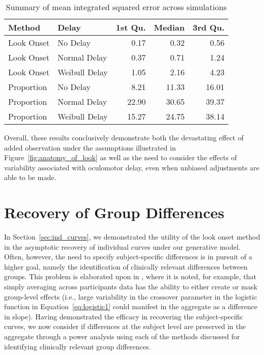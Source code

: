 \begin{table}[H]
\centering
\begin{tabular}{llrrr}
  \hline
Method & Delay & 1st Qu. & Median & 3rd Qu. \\ 
  \hline
Look Onset & No Delay & 0.17 & 0.32 & 0.56 \\ 
  Look Onset & Normal Delay & 0.37 & 0.71 & 1.24 \\ 
  Look Onset & Weibull Delay & 1.05 & 2.16 & 4.23 \\ 
  Proportion & No Delay & 8.21 & 11.33 & 16.01 \\ 
  Proportion & Normal Delay & 22.90 & 30.65 & 39.37 \\ 
  Proportion & Weibull Delay & 15.27 & 24.75 & 38.14 \\ 
   \hline
\end{tabular}
\caption{Summary of mean integrated squared error across simulations}
\label{tab:mise_sims}
\end{table}

Overall, these results conclusively demonstrate both the devastating effect of added observation under the assumptions illustrated in Figure~\ref{fig:anatomy_of_look} as well as the need to consider the effects of variability associated with oculomotor delay, even when unbiased adjustments are able to be made. 


\section{Recovery of Group Differences}



In Section~\ref{sec:ind_curves}, we demonstrated the utility of the look onset method in the asymptotic recovery of individual curves under our generative model. Often, however, the need to specify subject-specific differences is in pursuit of a higher goal, namely the identification of clinically relevant differences between groups. This problem is elaborated upon in \citet{mcmurray2010individual}, where it is noted, for example, that simply averaging across participants data has the ability to either create or mask group-level effects (i.e., large variability in the crossover parameter in the logistic function in Equation~\ref{eq:logistic1} could manifest in the aggregate as a difference in slope). Having demonstrated the efficacy in recovering the subject-specific curves, we now consider if differences at the subject level are preserved in the aggregate through a power analysis using each of the methods discussed for identifying clinically relevant group differences. 

